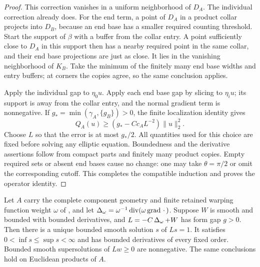 \begin{proof}
This correction vanishes in a uniform neighborhood of $D_A$.  The
individual correction already does.  For the end term, a point of
$D_A$ in a product collar projects into $D_B$, because an end base has a
smaller required counting threshold.  Start the support of $\beta$
with a buffer from the collar entry.  A point sufficiently close to
$D_A$ in this support then has a nearby required point in the same
collar, and their end base projections are just as close.  It lies in the
vanishing neighborhood of $K_B$.  Take the minimum of the finitely
many end base widths and entry buffers; at corners the copies agree, so
the same conclusion applies.

Apply the individual gap to $\eta_0u$.  Apply each end base gap by slicing
to $\eta_iu$; its support is away from the collar entry, and the
normal gradient term is nonnegative.  If
$g_* =\min(\gamma_A,\{g_B\})>0$, the finite localization identity gives
\[
 Q_A(u)\ge(g_*-Cc_A L^{-2})\|u\|_2^2.
\]
Choose $L$ so that the error is at most $g_*/2$.  All quantities used
for this choice are fixed before solving any elliptic equation.
Boundedness and the derivative assertions follow from compact parts
and finitely many product copies.  Empty required sets or absent end bases
cause no change: one may take $\theta=\pi/2$ or omit the corresponding
cutoff.  This completes the compatible induction and proves the
operator identity.
\end{proof}

\begin{lemma}[Bounded solutions of $Ls=1$]\label{regular:bounded-solutions}
Let $A$ carry the complete component geometry and finite retained warping function
weight $\omega$ of , and let
$\operatorname{\Delta}_\omega=\omega^{-1}\operatorname{div}(\omega\operatorname{grad}\,\cdot\,)$.  Suppose $W$ is smooth and bounded with bounded
derivatives, and $L=-C\operatorname{\Delta}_\omega+W$ has form gap $g>0$.  Then
there is a unique bounded smooth solution $s$ of $Ls=1$.
It satisfies $0<\inf s\le\sup s<\infty$ and has bounded derivatives
of every fixed order.  Bounded smooth supersolutions of $Lw\ge0$ are
nonnegative.  The same conclusions hold on Euclidean products of $A$.
\end{lemma}

